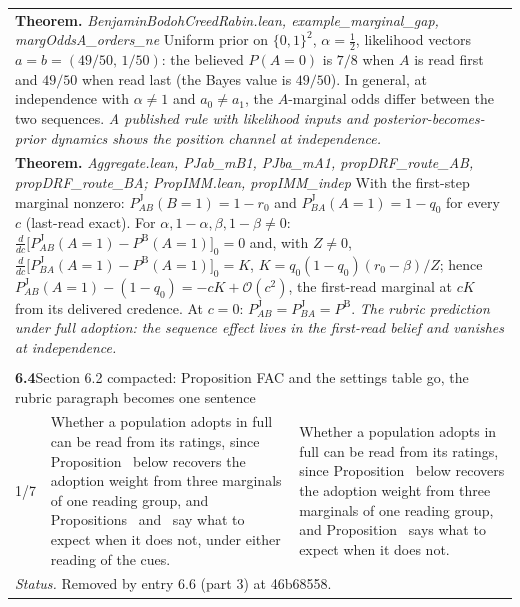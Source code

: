 \documentclass[10pt]{article}
\theoremstyle{definition}
\newcommand{\PB}{P^{\mathrm{B}}}
\newcommand{\PJ}{P^{\mathrm{J}}}
\newcommand{\bigO}{\mathcal{O}}
\renewcommand{\ref}[1]{\textsc{\detokenize{#1}}}
\newlength{\fullw}\setlength{\fullw}{25.9cm}
\newcommand{\entryhead}[2]{\multicolumn{3}{|l|}{\rule{0pt}{2.6ex}\large\textbf{#1}\quad #2} \\ \hline}
\begin{document}
{\begin{longtable}{|p{0.9cm}|p{12.2cm}|p{12.2cm}|}
\multicolumn{3}{|p{\fullw}|}{\textbf{Theorem.} \textit{BenjaminBodohCreedRabin.lean, example\_marginal\_gap, margOddsA\_orders\_ne} \newline Uniform prior on $\{0,1\}^2$, $\alpha=\tfrac12$, likelihood vectors
$a=b=(49/50,\,1/50)$: the believed $P(A{=}0)$ is $7/8$ when $A$ is read first and
$49/50$ when read last (the Bayes value is $49/50$). In general, at independence with
$\alpha\neq1$ and $a_0\neq a_1$, the $A$-marginal odds differ between the two
sequences. \newline \textit{A published rule with likelihood inputs and posterior-becomes-prior dynamics shows the position channel at independence.}} \\
\multicolumn{3}{|p{\fullw}|}{\textbf{Theorem.} \textit{Aggregate.lean, PJab\_mB1, PJba\_mA1, propDRF\_route\_AB, propDRF\_route\_BA; PropIMM.lean, propIMM\_indep} \newline With the first-step marginal nonzero: $\PJ_{AB}(B{=}1)=1-r_0$ and
$\PJ_{BA}(A{=}1)=1-q_0$ for every $c$ (last-read exact). For
$\alpha,1-\alpha,\beta,1-\beta\neq0$:
$\frac{d}{dc}\bigl[\PJ_{AB}(A{=}1)-\PB(A{=}1)\bigr]_{0}=0$ and, with $Z\neq0$,
$\frac{d}{dc}\bigl[\PJ_{BA}(A{=}1)-\PB(A{=}1)\bigr]_{0}=K$, $K=q_0(1-q_0)(r_0-\beta)/Z$;
hence $\PJ_{AB}(A{=}1)-(1-q_0)=-cK+\bigO(c^2)$, the first-read marginal at $cK$ from
its delivered credence. At $c=0$: $\PJ_{AB}=\PJ_{BA}=\PB$. \newline \textit{The rubric prediction under full adoption: the sequence effect lives in the first-read belief and vanishes at independence.}} \\ \hline
\multicolumn{3}{|l|}{} \\ \hline
\entryhead{6.4}{Section 6.2 compacted: Proposition FAC and the settings table go, the rubric paragraph becomes one sentence\quad{\footnotesize\textit{(formerly C.18)}}}
1/7 & Whether a population adopts in full can be read from its ratings, since Proposition~\ref{prop:ADJ} below recovers the adoption weight from three marginals of one reading group, and Propositions~\ref{prop:LAD} and~\ref{prop:FAC} say what to expect when it does not, under either reading of the cues. & Whether a population adopts in full can be read from its ratings, since Proposition~\ref{prop:ADJ} below recovers the adoption weight from three marginals of one reading group, and Proposition~\ref{prop:LAD} says what to expect when it does not. \\ \hline
\multicolumn{3}{|p{\fullw}|}{\textit{Status.} Removed by entry 6.6 (part 3) at 46b68558.} \\ \hline

\end{longtable}}
\end{document}
